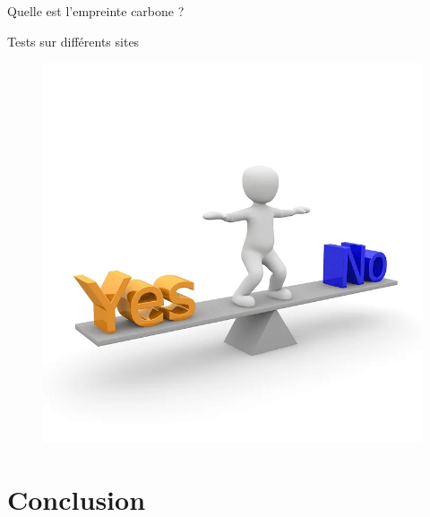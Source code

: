 \documentclass[10pt,xcolor={dvipsnames}]{beamer}
\begin{document}
\begin{frame}{Quelle est l'empreinte carbone ? }
\begin{block}{Tests sur différents sites}
\begin{minipage}[b]{0.5\linewidth}
\end{minipage}\hfill
\begin{minipage}[b]{0.5\linewidth}  
\begin{figure}
    \centering
    \includegraphics[scale=0.17]{Feathergraphics/int.png}
\end{figure}
\end{minipage}\hfill
\end{block}

\end{frame}



\section{Conclusion}
\end{document}

